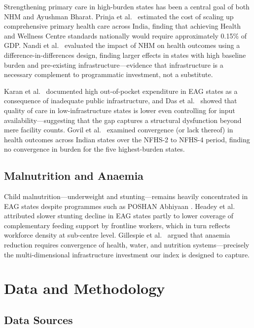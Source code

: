 \documentclass[conference]{IEEEtran}
\begin{document}
Strengthening primary care in high-burden states has been a central
goal of both NHM and Ayushman Bharat. Prinja et al.\ \cite{Prinja2021}
estimated the cost of scaling up comprehensive primary health care
across India, finding that achieving Health and Wellness Centre
standards nationally would require approximately 0.15\% of GDP.
Nandi et al.\ \cite{Nandi2017} evaluated the impact of NHM on health
outcomes using a difference-in-differences design, finding larger
effects in states with high baseline burden and pre-existing
infrastructure---evidence that infrastructure is a necessary complement
to programmatic investment, not a substitute.

Karan et al.\ \cite{Karan2017} documented high out-of-pocket
expenditure in EAG states as a consequence of inadequate public
infrastructure, and Das et al.\ \cite{Das2016} showed that quality
of care in low-infrastructure states is lower even controlling for
input availability---suggesting that the gap captures a structural
dysfunction beyond mere facility counts. Govil et al.\ \cite{Govil2016}
examined convergence (or lack thereof) in health outcomes across
Indian states over the NFHS-2 to NFHS-4 period, finding no convergence
in burden for the five highest-burden states.

\subsection{Malnutrition and Anaemia}

Child malnutrition---underweight and stunting---remains heavily
concentrated in EAG states despite programmes such as POSHAN Abhiyaan
\cite{Headey2017}. Headey et al.\ \cite{Headey2017} attributed slower
stunting decline in EAG states partly to lower coverage of
complementary feeding support by frontline workers, which in turn
reflects workforce density at sub-centre level. Gillespie et al.\
\cite{Gillespie2013} argued that anaemia reduction requires
convergence of health, water, and nutrition systems---precisely the
multi-dimensional infrastructure investment our index is designed
to capture.

\section{Data and Methodology}

\subsection{Data Sources}
\end{document}
